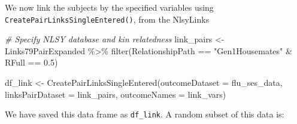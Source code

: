 \documentclass[10pt,a4paper,onecolumn]{article}
\newenvironment{Shaded}{\begin{snugshade}}{\end{snugshade}}
\newcommand{\AttributeTok}[1]{\textcolor[rgb]{0.77,0.63,0.00}{#1}}
\newcommand{\CommentTok}[1]{\textcolor[rgb]{0.56,0.35,0.01}{\textit{#1}}}
\newcommand{\FloatTok}[1]{\textcolor[rgb]{0.00,0.00,0.81}{#1}}
\newcommand{\FunctionTok}[1]{\textcolor[rgb]{0.00,0.00,0.00}{#1}}
\newcommand{\NormalTok}[1]{#1}
\newcommand{\OtherTok}[1]{\textcolor[rgb]{0.56,0.35,0.01}{#1}}
\newcommand{\SpecialCharTok}[1]{\textcolor[rgb]{0.00,0.00,0.00}{#1}}
\newcommand{\StringTok}[1]{\textcolor[rgb]{0.31,0.60,0.02}{#1}}
\begin{document}
We now link the subjects by the specified variables using
\texttt{CreatePairLinksSingleEntered()}, from the NlsyLinks

\begin{Shaded}
\begin{Highlighting}[]
\CommentTok{\# Specify NLSY database and kin relatedness }
\NormalTok{link\_pairs }\OtherTok{\textless{}{-}}\NormalTok{ Links79PairExpanded }\SpecialCharTok{\%\textgreater{}\%}
  \FunctionTok{filter}\NormalTok{(RelationshipPath }\SpecialCharTok{==} \StringTok{"Gen1Housemates"} \SpecialCharTok{\&}\NormalTok{ RFull }\SpecialCharTok{==} \FloatTok{0.5}\NormalTok{)}

\NormalTok{df\_link }\OtherTok{\textless{}{-}} \FunctionTok{CreatePairLinksSingleEntered}\NormalTok{(}\AttributeTok{outcomeDataset =}\NormalTok{ flu\_ses\_data,}
                                        \AttributeTok{linksPairDataset =}\NormalTok{ link\_pairs,}
                                        \AttributeTok{outcomeNames =}\NormalTok{ link\_vars)}
\end{Highlighting}
\end{Shaded}

We have saved this data frame as \texttt{df\_link}. A random subset of
this data is:

\begin{table}[!h]
\centering
{}
\end{table}
\end{document}
